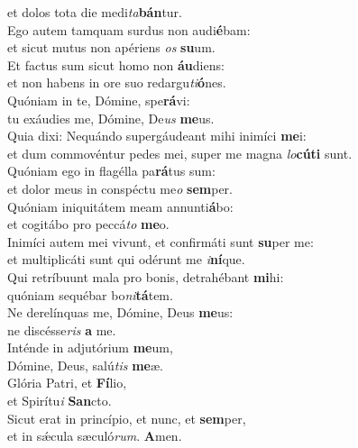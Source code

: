 \oddverse et dolos tota die medi\textit{ta}\textbf{bán}tur.\\
\evenverse Ego autem tamquam surdus non audi\textbf{é}bam:~\*\\
\evenverse et sicut mutus non apériens \textit{os} \textbf{su}um.\\
\oddverse Et factus sum sicut homo non \textbf{áu}diens:~\*\\
\oddverse et non habens in ore suo redargu\textit{ti}\textbf{ó}nes.\\
\evenverse Quóniam in te, Dómine, spe\textbf{rá}vi:~\*\\
\evenverse tu exáudies me, Dómine, De\textit{us} \textbf{me}us.\\
\oddverse Quia dixi: Nequándo supergáudeant mihi inimíci \textbf{me}i:~\*\\
\oddverse et dum commovéntur pedes mei, super me magna \textit{lo}\textbf{cú}\textbf{ti} sunt.\\
\evenverse Quóniam ego in flagélla pa\textbf{rá}tus sum:~\*\\
\evenverse et dolor meus in conspéctu me\textit{o} \textbf{sem}per.\\
\oddverse Quóniam iniquitátem meam annunti\textbf{á}bo:~\*\\
\oddverse et cogitábo pro peccá\textit{to} \textbf{me}o.\\
\evenverse Inimíci autem mei vivunt, et confirmáti sunt \textbf{su}per me:~\*\\
\evenverse et multiplicáti sunt qui odérunt me \textit{i}\textbf{ní}que.\\
\oddverse Qui retríbuunt mala pro bonis, detrahébant \textbf{mi}hi:~\*\\
\oddverse quóniam sequébar bo\textit{ni}\textbf{tá}tem.\\
\evenverse Ne derelínquas me, Dómine, Deus \textbf{me}us:~\*\\
\evenverse ne discésse\textit{ris} \textbf{a} me.\\
\oddverse Inténde in adjutórium \textbf{me}um,~\*\\
\oddverse Dómine, Deus, salú\textit{tis} \textbf{me}æ.\\
\evenverse Glória Patri, et \textbf{Fí}lio,~\*\\
\evenverse et Spirítu\textit{i} \textbf{San}cto.\\
\oddverse Sicut erat in princípio, et nunc, et \textbf{sem}per,~\*\\
\oddverse et in sǽcula sæculó\textit{rum}. \textbf{A}men.\\
